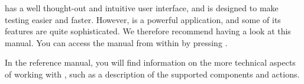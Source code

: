 \jb{} has a well thought-out and intuitive user interface, and is designed to make testing easier and faster. However,  \jb{} is a powerful application, and some of its features are quite sophisticated. We therefore recommend having a look at this manual. You can access the manual from within \jb{} by pressing .  

In the reference manual, you will find information on the more technical aspects of working with \jb{}, such as a description of the supported components and actions. 



